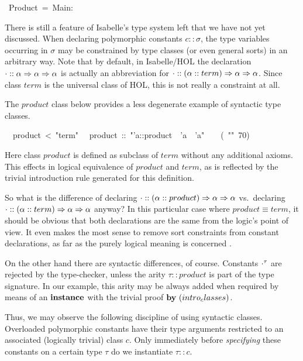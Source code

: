 \begin{isabelle}%
%
~Product~=~Main:%
\begin{isamarkuptext}%
\medskip\noindent There is still a feature of Isabelle's type system
 left that we have not yet discussed.  When declaring polymorphic
 constants $c :: \sigma$, the type variables occurring in $\sigma$ may
 be constrained by type classes (or even general sorts) in an
 arbitrary way.  Note that by default, in Isabelle/HOL the declaration
 $\cdot :: \alpha \Rightarrow \alpha \Rightarrow \alpha$ is actually an abbreviation
 for $\cdot :: (\alpha::term) \Rightarrow \alpha \Rightarrow \alpha$.  Since class
 $term$ is the universal class of HOL, this is not really a constraint
 at all.

 The $product$ class below provides a less degenerate example of
 syntactic type classes.%
\end{isamarkuptext}%
\isanewline
~~product~<~{"}term{"}\isanewline
{}\isanewline
~~product~::~{"}'a::product~{\isasymRightarrow}~'a~{\isasymRightarrow}~'a{"}~~~~(~{"}{\isasymOtimes}{"}~70)%
\begin{isamarkuptext}%
Here class $product$ is defined as subclass of $term$ without any
 additional axioms.  This effects in logical equivalence of $product$
 and $term$, as is reflected by the trivial introduction rule
 generated for this definition.

 \medskip So what is the difference of declaring $\cdot :: (\alpha ::
 product) \Rightarrow \alpha \Rightarrow \alpha$ vs.\ declaring $\cdot :: (\alpha ::
 term) \Rightarrow \alpha \Rightarrow \alpha$ anyway?  In this particular case where
 $product \equiv term$, it should be obvious that both declarations
 are the same from the logic's point of view.  It even makes the most
 sense to remove sort constraints from constant declarations, as far
 as the purely logical meaning is concerned \cite{Wenzel:1997:TPHOL}.

 On the other hand there are syntactic differences, of course.
 Constants $\cdot^\tau$ are rejected by the type-checker, unless the
 arity $\tau :: product$ is part of the type signature.  In our
 example, this arity may be always added when required by means of an
 ${\mathord{\mathbf{instance}}}$ with the trivial proof $\BY{intro_classes}$.

 \medskip Thus, we may observe the following discipline of using
 syntactic classes.  Overloaded polymorphic constants have their type
 arguments restricted to an associated (logically trivial) class $c$.
 Only immediately before \emph{specifying} these constants on a
 certain type $\tau$ do we instantiate $\tau :: c$.


\end{isamarkuptext}
\end{isabelle}
